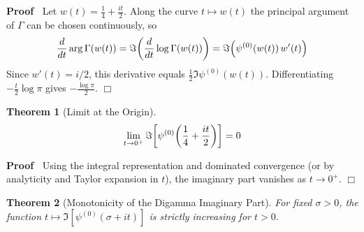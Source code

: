 \documentclass{article}
\newenvironment{proof}{\noindent\textbf{Proof\ }}{\hspace*{\fill}$\Box$\medskip}
\newtheorem{theorem}{Theorem}
\begin{document}
\begin{proof}
  Let $w (t) = \frac{1}{4} + \frac{it}{2}$. Along the curve $t \mapsto w (t)$
  the principal argument of $\Gamma$ can be chosen continuously, so
  \begin{equation}
    \frac{d}{dt} \arg \Gamma (w (t)) = \Im \hspace{-0.17em} \left(
    \frac{d}{dt} \log \Gamma (w (t)) \right) = \Im \hspace{-0.17em} \left(
    \psi^{(0)} (w (t)) \hspace{0.17em} w' (t) \right)
  \end{equation}
  Since $w' (t) = i / 2$, this derivative equals $\frac{1}{2} \Im \psi^{(0)}
  (w (t))$. Differentiating $- \frac{t}{2} \log \pi$ gives $- \frac{\log
  \pi}{2}$.
\end{proof}

\begin{theorem}
  [Limit at the Origin]\label{thm:limit}
  \begin{equation}
    \lim_{t \to 0^+} \Im \hspace{-0.17em} \left[ \psi^{(0)}  \hspace{-0.17em}
    \left( \frac{1}{4} + \frac{it}{2} \right) \right] = 0
  \end{equation}
\end{theorem}

\begin{proof}
  Using the integral representation {\cite{AbramowitzStegun6.3.1}} and
  dominated convergence (or by analyticity and Taylor expansion in $t$), the
  imaginary part vanishes as $t \to 0^+$.
\end{proof}

\begin{theorem}
  [Monotonicity of the Digamma Imaginary Part]\label{thm:monotonicity} For
  fixed $\sigma > 0$, the function $t \mapsto \Im [\psi^{(0)} (\sigma + it)]$
  is strictly increasing for $t > 0$.
\end{theorem}
\end{document}
